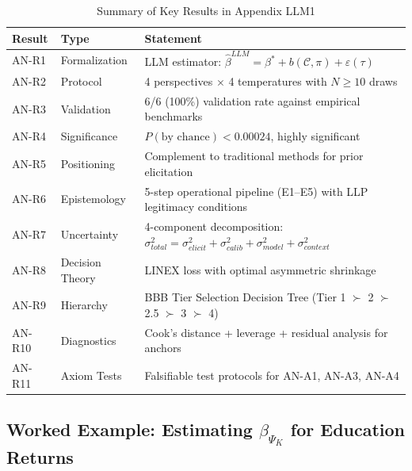 \begin{table}[htbp]
\centering
\caption{Summary of Key Results in Appendix LLM1}
\label{tab:AN-results}
\renewcommand{\arraystretch}{1.2}
\begin{tabular}{@{}llp{6.5cm}@{}}
\toprule
\textbf{Result} & \textbf{Type} & \textbf{Statement} \\
\midrule
AN-R1 & Formalization & LLM estimator: $\hat{\beta}^{LLM} = \beta^* + b(\mathcal{C}, \pi) + \varepsilon(\tau)$ \\
AN-R2 & Protocol & 4 perspectives $\times$ 4 temperatures with $N \geq 10$ draws \\
AN-R3 & Validation & 6/6 (100\%) validation rate against empirical benchmarks \\
AN-R4 & Significance & $P(\text{by chance}) < 0.00024$, highly significant \\
AN-R5 & Positioning & Complement to traditional methods for prior elicitation \\
AN-R6 & Epistemology & 5-step operational pipeline (E1--E5) with LLP legitimacy conditions \\
AN-R7 & Uncertainty & 4-component decomposition: $\sigma^2_{total} = \sigma^2_{elicit} + \sigma^2_{calib} + \sigma^2_{model} + \sigma^2_{context}$ \\
AN-R8 & Decision Theory & LINEX loss with optimal asymmetric shrinkage \\
AN-R9 & Hierarchy & BBB Tier Selection Decision Tree (Tier 1 $\succ$ 2 $\succ$ 2.5 $\succ$ 3 $\succ$ 4) \\
AN-R10 & Diagnostics & Cook's distance + leverage + residual analysis for anchors \\
AN-R11 & Axiom Tests & Falsifiable test protocols for AN-A1, AN-A3, AN-A4 \\
\bottomrule
\end{tabular}
\end{table}


\subsection{Worked Example: Estimating $\beta_{\Psi_K}$ for Education Returns}
\label{sec:AN-example}

